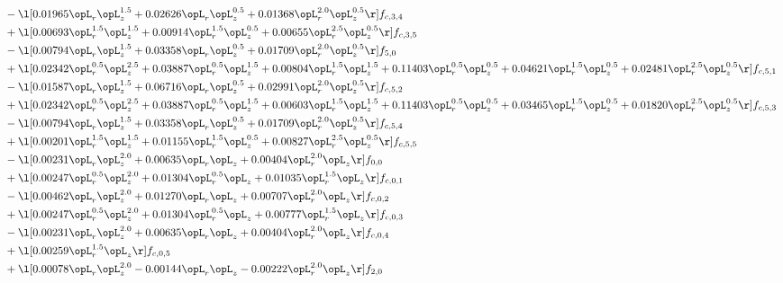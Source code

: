 \begin{alignat}{2}
& - \l[  0.01965 \opL_r \opL_z^{1.5} +  0.02626 \opL_r \opL_z^{0.5} +  0.01368 \opL_r^{2.0} \opL_z^{0.5}  \r] f_{c,3,4} \nonumber \\ 
& + \l[  0.00693 \opL_r^{1.5} \opL_z^{1.5} +  0.00914 \opL_r^{1.5} \opL_z^{0.5} +  0.00655 \opL_r^{2.5} \opL_z^{0.5}  \r] f_{c,3,5} \nonumber \\ 
& - \l[  0.00794 \opL_r \opL_z^{1.5} +  0.03358 \opL_r \opL_z^{0.5} +  0.01709 \opL_r^{2.0} \opL_z^{0.5}  \r] f_{5,0} \nonumber \\ 
& + \l[  0.02342 \opL_r^{0.5} \opL_z^{2.5} +  0.03887 \opL_r^{0.5} \opL_z^{1.5} +  0.00804 \opL_r^{1.5} \opL_z^{1.5} +  0.11403 \opL_r^{0.5} \opL_z^{0.5} +  0.04621 \opL_r^{1.5} \opL_z^{0.5} +  0.02481 \opL_r^{2.5} \opL_z^{0.5}  \r] f_{c,5,1} \nonumber \\ 
& - \l[  0.01587 \opL_r \opL_z^{1.5} +  0.06716 \opL_r \opL_z^{0.5} +  0.02991 \opL_r^{2.0} \opL_z^{0.5}  \r] f_{c,5,2} \nonumber \\ 
& + \l[  0.02342 \opL_r^{0.5} \opL_z^{2.5} +  0.03887 \opL_r^{0.5} \opL_z^{1.5} +  0.00603 \opL_r^{1.5} \opL_z^{1.5} +  0.11403 \opL_r^{0.5} \opL_z^{0.5} +  0.03465 \opL_r^{1.5} \opL_z^{0.5} +  0.01820 \opL_r^{2.5} \opL_z^{0.5}  \r] f_{c,5,3} \nonumber \\ 
& - \l[  0.00794 \opL_r \opL_z^{1.5} +  0.03358 \opL_r \opL_z^{0.5} +  0.01709 \opL_r^{2.0} \opL_z^{0.5}  \r] f_{c,5,4} \nonumber \\ 
& + \l[  0.00201 \opL_r^{1.5} \opL_z^{1.5} +  0.01155 \opL_r^{1.5} \opL_z^{0.5} +  0.00827 \opL_r^{2.5} \opL_z^{0.5}  \r] f_{c,5,5} \nonumber \\ 
& - \l[  0.00231 \opL_r \opL_z^{2.0} +  0.00635 \opL_r \opL_z +  0.00404 \opL_r^{2.0} \opL_z  \r] f_{0,0} \nonumber \\ 
& + \l[  0.00247 \opL_r^{0.5} \opL_z^{2.0} +  0.01304 \opL_r^{0.5} \opL_z +  0.01035 \opL_r^{1.5} \opL_z  \r] f_{c,0,1} \nonumber \\ 
& - \l[  0.00462 \opL_r \opL_z^{2.0} +  0.01270 \opL_r \opL_z +  0.00707 \opL_r^{2.0} \opL_z  \r] f_{c,0,2} \nonumber \\ 
& + \l[  0.00247 \opL_r^{0.5} \opL_z^{2.0} +  0.01304 \opL_r^{0.5} \opL_z +  0.00777 \opL_r^{1.5} \opL_z  \r] f_{c,0,3} \nonumber \\ 
& - \l[  0.00231 \opL_r \opL_z^{2.0} +  0.00635 \opL_r \opL_z +  0.00404 \opL_r^{2.0} \opL_z  \r] f_{c,0,4} \nonumber \\ 
& + \l[  0.00259 \opL_r^{1.5} \opL_z  \r] f_{c,0,5} \nonumber \\ 
& + \l[  0.00078 \opL_r \opL_z^{2.0}   -0.00144 \opL_r \opL_z   -0.00222 \opL_r^{2.0} \opL_z  \r] f_{2,0} \nonumber \\ 

\end{alignat}
